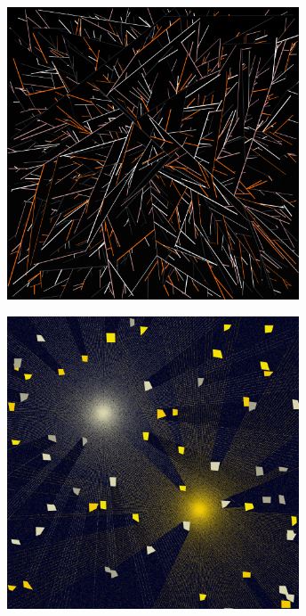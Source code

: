 \documentclass[11pt,twoside]{book}
\begin{document}
\begin{figure}[!ht]
\includegraphics[width=246pt]{orange-bf4c5af2-d76f-439d-a2a5-676b520f3706.png}
\end{figure}
\newpage
{}
\fancyfoot[CE,CO]{\fontsize{10}{12}\selectfont \thepage}
\begin{figure}[!ht]
\includegraphics[width=246pt]{lemon-5c7fd634-1583-4f27-b423-b9e091172b19.png}
\end{figure}
\newpage
{}
\fancyfoot[CE,CO]{\fontsize{10}{12}\selectfont \thepage}
\end{document}
